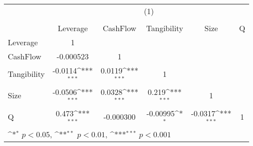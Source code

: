 {
\def\sym#1{\ifmmode^{#1}\else\(^{#1}\)\fi}
\begin{tabular}{l*{5}{c}}
\hline\hline
          &\multicolumn{5}{c}{(1)}                                                                       \\
          &\multicolumn{5}{c}{}                                                                          \\
          & Leverage         & CashFlow         &Tangibility         &     Size         &        Q         \\
\hline
Leverage  &        1         &                  &                  &                  &                  \\
CashFlow  &-0.000523         &        1         &                  &                  &                  \\
Tangibility&  -0.0114\sym{***}&   0.0119\sym{***}&        1         &                  &                  \\
Size      &  -0.0506\sym{***}&   0.0328\sym{***}&    0.219\sym{***}&        1         &                  \\
Q         &    0.473\sym{***}&-0.000300         & -0.00995\sym{*}  &  -0.0317\sym{***}&        1         \\
\hline\hline
\multicolumn{6}{l}{\footnotesize \sym{*} \(p<0.05\), \sym{**} \(p<0.01\), \sym{***} \(p<0.001\)}\\
\end{tabular}
}

